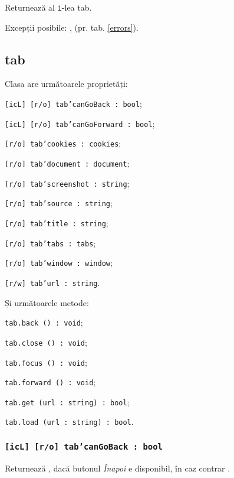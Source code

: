 Returnează al \texttt{i}-lea tab.

Excepții posibile: ,  (pr. tab. \ref{errors}).

\subsection{tab}

Clasa \tab{} are următoarele proprietăți:
\begin{icItems}
	\item \texttt{[icL] [r/o] tab'canGoBack : bool};
	\item \texttt{[icL] [r/o] tab'canGoForward : bool};
	\item \texttt{[r/o] tab'cookies : cookies};
	\item \texttt{[r/o] tab'document : document};
	\item \texttt{[r/o] tab'screenshot : string};
	\item \texttt{[r/o] tab'source : string};
	\item \texttt{[r/o] tab'title : string};
	\item \texttt{[r/o] tab'tabs : tabs};
	\item \texttt{[r/o] tab'window : window};
	\item \texttt{[r/w] tab'url : string}.
\end{icItems}

Și următoarele metode:
\begin{icItems}
	\item \texttt{tab.back () : void};
	\item \texttt{tab.close () : void};
	\item \texttt{tab.focus () : void};
	\item \texttt{tab.forward () : void};
	\item \texttt{tab.get (url : string) : bool};
	\item \texttt{tab.load (url : string) : bool}.
\end{icItems}

\subsubsection{\texttt{[icL] [r/o] tab'canGoBack : bool}}

Returnează \true, dacă butonul \textit{Înapoi} e disponibil, în caz contrar \false.

